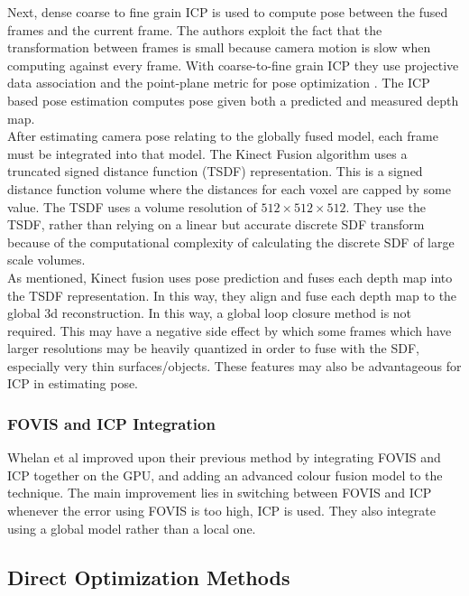 Next, dense coarse to fine grain ICP is used to compute pose between the fused frames and the current frame. The authors exploit the fact that the transformation between frames is small because camera motion is slow when computing against every frame. With coarse-to-fine grain ICP they use projective data association \cite{Blais95Registering} and the point-plane metric for pose optimization \cite{Rusinkiewicz02Real}. The ICP based pose estimation computes pose given both a predicted and measured depth map. \\

After estimating camera pose relating to the globally fused model, each frame must be integrated into that model. The Kinect Fusion algorithm uses a truncated signed distance function (TSDF) representation. This is a signed distance function volume where the distances for each voxel are capped by some value. The TSDF uses a volume resolution of $512\times 512\times 512$. They use the TSDF, rather than relying on a linear but accurate discrete SDF transform \cite{Rasch09Remarks} because of the computational complexity of calculating the discrete SDF of large scale volumes. \\

As mentioned, Kinect fusion uses pose prediction and fuses each depth map into the TSDF representation. In this way, they align and fuse each depth map to the global 3d reconstruction. In this way, a global loop closure method is not required. This may have a negative side effect by which some frames which have larger resolutions may be heavily quantized in order to fuse with the SDF, especially very thin surfaces/objects. These features may also be advantageous for ICP in estimating pose. 


\subsubsection{FOVIS and ICP Integration}

Whelan et al improved \cite{Whelan13Robust} upon their previous method \cite{Whelan12Kintinous} by integrating FOVIS and ICP together on the GPU, and adding an advanced colour fusion model to the technique. The main improvement lies in switching between FOVIS and ICP whenever the error using FOVIS is too high, ICP is used. They also integrate using a global model rather than a local one. 


\subsection{Direct Optimization Methods}

